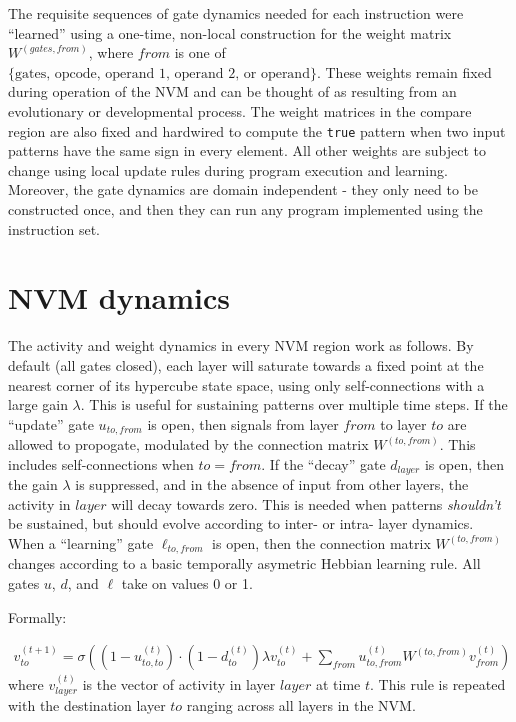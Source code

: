 \documentclass[pdftex,12pt,letterpaper]{article}
\begin{document}
The requisite sequences of gate dynamics needed for each instruction were ``learned'' using a one-time, non-local construction for the weight matrix $W^{(gates, from)}$, where $from$ is one of $\{\text{gates, opcode, operand 1, operand 2, or operand}\}$.  These weights remain fixed during operation of the NVM and can be thought of as resulting from an evolutionary or developmental process.  The weight matrices in the compare region are also fixed and hardwired to compute the \texttt{true} pattern when two input patterns have the same sign in every element.  All other weights are subject to change using local update rules during program execution and learning.  Moreover, the gate dynamics are domain independent - they only need to be constructed once, and then they can run any program implemented using the instruction set.

\section{NVM dynamics}

The activity and weight dynamics in every NVM region work as follows.  By default (all gates closed), each layer will saturate towards a fixed point at the nearest corner of its hypercube state space, using only self-connections with a large gain $\lambda$.  This is useful for sustaining patterns over multiple time steps.  If the ``update'' gate $u_{to,from}$ is open, then signals from layer $from$ to layer $to$ are allowed to propogate, modulated by the connection matrix $W^{(to,from)}$.  This includes self-connections when $to = from$.  If the ``decay'' gate $d_{layer}$ is open, then the gain $\lambda$ is suppressed, and in the absence of input from other layers, the activity in $layer$ will decay towards zero.  This is needed when patterns \emph{shouldn't} be sustained, but should evolve according to inter- or intra- layer dynamics.  When a ``learning'' gate $\ell_{to,from}$ is open, then the connection matrix $W^{(to,from)}$ changes according to a basic temporally asymetric Hebbian learning rule.  All gates $u$, $d$, and $\ell$ take on values 0 or 1.

Formally:

\begin{align}
v^{(t+1)}_{to} = \sigma\left((1-u^{(t)}_{to,to})\cdot(1 - d^{(t)}_{to})\lambda v^{(t)}_{to} + \sum_{from}u^{(t)}_{to,from}W^{(to,from)}v^{(t)}_{from}\right)
\label{eq:actrule}
\end{align}
where $v^{(t)}_{layer}$ is the vector of activity in layer $layer$ at time $t$.  This rule is repeated with the destination layer $to$ ranging across all layers in the NVM.
\end{document}
